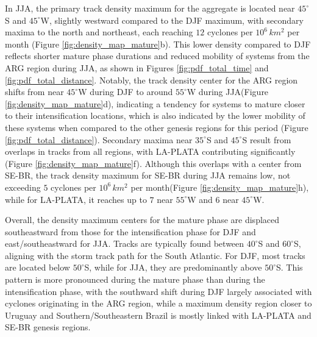 In JJA, the primary track density maximum for the aggregate is located near \(45^\circ\)S and \(45^\circ\)W, slightly westward compared to the DJF maximum, with secondary maxima to the north and northeast, each reaching \(12\) cyclones per \(10^6 \, km^2\) per month (Figure \ref{fig:density_map_mature}b). This lower density compared to DJF reflects shorter mature phase durations and reduced mobility of systems from the ARG region during JJA, as shown in Figures \ref{fig:pdf_total_time} and \ref{fig:pdf_total_distance}. Notably, the track density center for the ARG region shifts from near \(45^\circ\)W during DJF to around \(55^\circ\)W during JJA(Figure \ref{fig:density_map_mature}d), indicating a tendency for systems to mature closer to their intensification locations, which is also indicated by the lower mobility of these systems when compared to the other genesis regions for this period (Figure \ref{fig:pdf_total_distance}). Secondary maxima near \(35^\circ\)S and \(45^\circ\)S result from overlaps in tracks from all regions, with LA-PLATA contributing significantly (Figure \ref{fig:density_map_mature}f). Although this overlaps with a center from SE-BR, the track density maximum for SE-BR during JJA remains low, not exceeding \(5\) cyclones per \(10^6 \, km^2\) per month(Figure \ref{fig:density_map_mature}h), while for LA-PLATA, it reaches up to \(7\) near \(55^\circ\)W and \(6\) near \(45^\circ\)W.

Overall, the density maximum centers for the mature phase are displaced southeastward from those for the intensification phase for DJF and east/southeastward for JJA. Tracks are typically found between \(40^\circ\)S and \(60^\circ\)S, aligning with the storm track path for the South Atlantic. For DJF, most tracks are located below \(50^\circ\)S, while for JJA, they are predominantly above \(50^\circ\)S. This pattern is more pronounced during the mature phase than during the intensification phase, with the southward shift during DJF largely associated with cyclones originating in the ARG region, while a maximum density region closer to Uruguay and Southern/Southeastern Brazil is mostly linked with LA-PLATA and SE-BR genesis regions.



